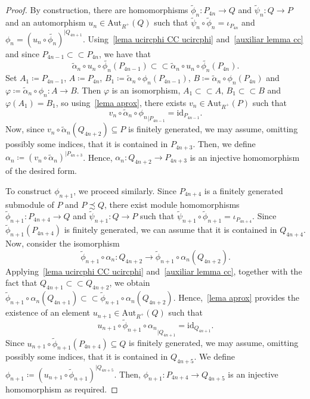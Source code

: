 \documentclass[11pt]{amsart}
\numberwithin{equation}{section}
\theoremstyle{definition}
\newcommand{\cc}{\subset\!\subset}
\newcommand{\tiphi}{\tilde{\phi}}
\newcommand{\tipsi}{\tilde{\psi}}
\theoremstyle{plain}
\theoremstyle{definition}
\begin{document}
\begin{proof}
By construction, there are homomorphisms $\tilde{\phi}_n \colon P_{4n} \rightarrow Q$ and $\tilde{\psi}_n \colon Q \rightarrow P$ and an automorphism $u_n \in \mathrm{Aut}_{R^+}(Q)$ such that $\tilde{\psi}_n \circ \tilde{\phi}_n = \iota_{P_{4n}}$ and $\phi_n = (u_n \circ \tilde{\phi_n})^{|Q_{4n + 1}}$. Using~\autoref{lema ucircphi CC ucircphi} and~\autoref{auxiliar lemma cc} and since $P_{4n - 1} \subset\!\subset P_{4n}$, we have that $$\tilde{\alpha}_n\circ u_n \circ \tilde{\phi_n}(P_{4n - 1}) \subset\!\subset \tilde{\alpha}_n\circ u_n \circ \tilde{\phi_n}(P_{4n}).$$ 
Set $A_1 \coloneqq P_{4n - 1}$, $A \coloneqq P_{4n}$, $B_1 \coloneqq \tilde{\alpha}_n\circ\phi_n(P_{4n - 1})$, $B \coloneqq \tilde{\alpha}_n\circ\phi_n(P_{4n})$ and $\varphi \coloneqq \tilde{\alpha}_n\circ\phi_n \colon A \rightarrow B$. Then $\varphi$ is an isomorphism, $A_1 \cc A$, $B_1 \cc B$ and $\varphi(A_1) = B_1$, so using~\autoref{lema aprox}, there exists $v_n \in \mathrm{Aut}_{R^+}(P)$ such that
\begin{equation} \label{eq1 main teo}
{v_n \circ \tilde{\alpha}_n \circ \phi_n}_{|P_{4n-1}} = \mathrm{id}_{P_{4n - 1}}. 
\end{equation}
Now, since $v_n \circ \tilde{\alpha}_n(Q_{4n+2}) \subseteq P$ is finitely generated, we may assume, omitting possibly some indices, that it is contained in $P_{4n + 3}$. Then, we define $\alpha_n \coloneqq (v_n \circ \tilde{\alpha}_n)^{|P_{4n + 3}}$. Hence, $\alpha_n \colon Q_{4n + 2} \to P_{4n + 3}$ is an injective homomorphism of the desired form. 

To construct $\phi_{n+1}$, we proceed similarly. Since $P_{4n + 4}$ is a finitely generated submodule of $P$ and $P \precsim Q$, there exist module homomorphisms $\tiphi_{n+1} \colon P_{4n + 4} \rightarrow Q$ and $\tipsi_{n+1} \colon Q \rightarrow P$ such that $\tipsi_{n+1} \circ \tiphi_{n+1} = \iota_{P_{4n+4}}$. Since $\tiphi_{n+1}(P_{4n+4})$ is finitely generated, we can assume that it is contained in $Q_{4n+4}$. Now, consider the isomorphism 
\begin{equation*}
    \tiphi_{n+1} \circ \alpha_n \colon Q_{4n+2} \rightarrow \tiphi_{n+1} \circ \alpha_n(Q_{4n + 2}).
\end{equation*}
Applying~\autoref{lema ucircphi CC ucircphi} and~\autoref{auxiliar lemma cc}, together with the fact that $Q_{4n + 1} \cc Q_{4n + 2}$, we obtain $\tiphi_{n+1}\circ\alpha_n(Q_{4n + 1}) \cc \tiphi_{n+1}\circ\alpha_n(Q_{4n + 2})$. Hence,~\autoref{lema aprox} provides the  existence of an element $u_{n+1} \in \mathrm{Aut}_{R^+}(Q)$ such that 
\begin{equation} \label{eq2 main teo}
    {u_{n+1}\circ \tiphi_{n+1} \circ \alpha_n}_{|Q_{4n+1}} = \mathrm{id}_{Q_{4n+1}}.
\end{equation}
Since $u_{n+1} \circ \tiphi_{n+1}(P_{4n+4}) \subseteq Q$ is finitely generated, we may assume, omitting possibly some indices, that it is contained in $Q_{4n + 5}$. We define $\phi_{n+1} \coloneqq (u_{n+1} \circ \tiphi_{n+1})^{|Q_{4n + 5}}$. Then, $\phi_{n+1} \colon P_{4n + 4} \to Q_{4n + 5}$ is an injective homomorphism as required. 


\end{proof}
\end{document}
